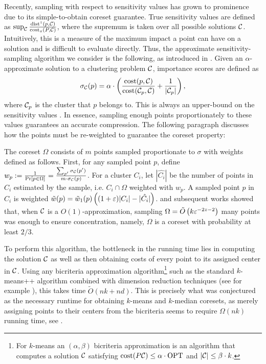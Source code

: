 Recently, sampling with respect to sensitivity values has grown to prominence due to its simple-to-obtain coreset guarantee.  True sensitivity values are defined
as $\sup_{\mathcal C} \frac{\operatorname{dist}^z(p, \mathcal C)}{\operatorname{cost}_z(P, \mathcal C)}$, where the supremum is taken over all possible solutions $\mathcal C$. Intuitively, this is a measure
of the maximum impact a point can have on a solution and is difficult to evaluate directly.
Thus, the approximate sensitivity-sampling algorithm we consider is the following, as introduced in \cite{FL11}.
Given an $\alpha$-approximate solution to a clustering problem $\mathcal C$, importance scores are defined as
\begin{equation}
\label{eq:sensitivity}
\sigma_\mathcal C(p) = \alpha \cdot \left( \dfrac{\operatorname{cost}(p, \mathcal C)}{\operatorname{cost}(\mathcal C_{p}, \mathcal C)} + \dfrac{1}{|\mathcal C_p|} \right),
\end{equation}
where $\mathcal C_p$ is the cluster that $p$ belongs to. This is always an upper-bound on the sensitivity values \cite{FL11}. In essence, sampling enough points
proportionately to these values guarantees an accurate compression. The following paragraph discusses how the points must be re-weighted to guarantee the
coreset property:

The coreset $\Omega$ consists of $m$ points sampled proportionate to $\sigma$ with weights defined as follows. First, for any sampled point $p$, define
$w_p := \frac{1}{\Pr[p \in \Omega]} = \frac{\sum_{p'} \sigma_\mathcal C(p')}{m \cdot \sigma_\mathcal C(p)}$. For a cluster $C_i$, let $|\hat{C_i}|$ be the number of
points in $C_i$ estimated by the sample, i.e. $C_i \cap \Omega$ weighted with $w_p$. A sampled point $p$ in $C_i$ is weighted $\tilde w(p) = \tilde w_1(p) \left(
(1+\varepsilon)|C_i| - |\hat{C_i}|\right)$.  \cite{HuangV20} and subsequent works showed that, when $\mathcal C$ is a $O(1)$-approximation, sampling $\Omega = \tilde O\left(
k \varepsilon^{-2z-2}\right)$ many points was enough to ensure concentration, namely, $\Omega$ is a coreset with probability at least $2/3$.

To perform this algorithm, the bottleneck in the running time lies in computing the solution $\mathcal C$ as well as then obtaining costs of every point to its
assigned center in $\mathcal C$. Using any bicriteria approximation algorithm\footnote{For $k$-means an $(\alpha,\beta)$ bicriteria approximation is an algorithm
that computes a solution $\mathcal C$ satisfying $\operatorname{cost}(P\mathcal C)\leq \alpha\cdot \text{OPT}$ and $|\mathcal C|\leq \beta\cdot k$.} such as the standard $k$-means++ algorithm
\cite{ArV07} combined with dimension reduction techniques (see for example \cite{BecchettiBC0S19,CohenEMMP15,MakarychevMR19}), this takes time $\tilde O(nk
+nd)$. This is precisely what was conjectured as the necessary runtime for obtaining $k$-means and $k$-median coresets, as merely assigning points to their
centers from the bicriteria seems to require $\Omega(nk)$ running time, see \cite{DSWY22}. 

